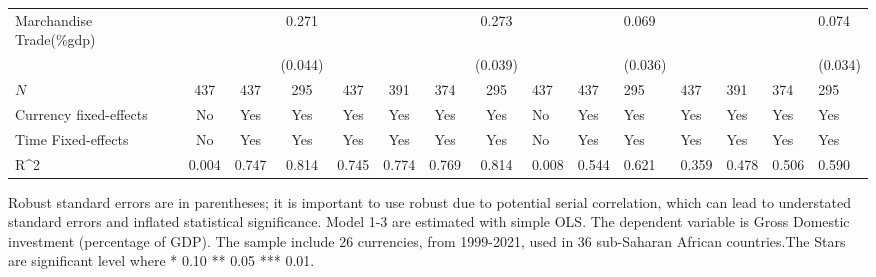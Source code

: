 \begin{table}[H]
\begin{adjustbox}{max width=\textwidth}
\begin{tabular}{l*{7}{c}}
Marchandise Trade(\%gdp)&                     &                     &       0.271\sym{***}&                     &                     &                     &       0.273\sym{***}&                     &                     &       0.069\sym{*}  &                     &                     &                     &       0.074\sym{**} \\
            &                     &                     &     (0.044)         &                     &                     &                     &     (0.039)         &                     &                     &     (0.036)         &                     &                     &                     &     (0.034)         \\
\midrule
\(N\)       &         437         &         437         &         295         &         437         &         391         &         374         &         295         &         437         &         437         &         295         &         437         &         391         &         374         &         295         \\
Currency fixed-effects&          No         &         Yes         &         Yes         &         Yes         &         Yes         &         Yes         &         Yes         &          No         &         Yes         &         Yes         &         Yes         &         Yes         &         Yes         &         Yes         \\
Time Fixed-effects&          No         &         Yes         &         Yes         &         Yes         &         Yes         &         Yes         &         Yes         &          No         &         Yes         &         Yes         &         Yes         &         Yes         &         Yes         &         Yes         \\
R^{2}       &       0.004         &       0.747         &       0.814         &       0.745         &       0.774         &       0.769         &       0.814         &       0.008         &       0.544         &       0.621         &       0.359         &       0.478         &       0.506         &       0.590         \\
\bottomrule \end{tabular} \end{adjustbox} \footnotesize \item Robust standard errors are in parentheses; it is important to use robust due to potential serial correlation, which can lead to understated standard errors and inflated statistical significance. Model 1-3 are estimated with simple OLS. The dependent variable is Gross Domestic investment (percentage of GDP). The sample include 26 currencies, from 1999-2021, used in 36 sub-Saharan African countries.The Stars are significant level where * 0.10 ** 0.05 *** 0.01. \end{table}
